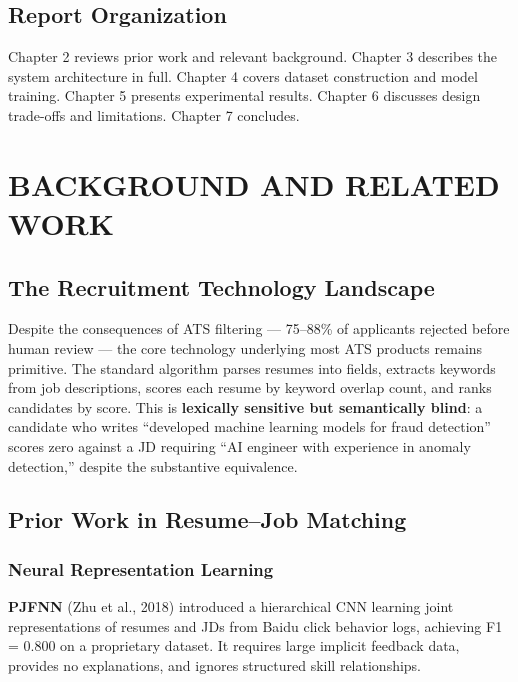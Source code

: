 \documentclass[12pt,a4paper]{report}
\begin{document}
\section{Report Organization}

Chapter 2 reviews prior work and relevant background. Chapter 3 describes the system architecture in full. Chapter 4 covers dataset construction and model training. Chapter 5 presents experimental results. Chapter 6 discusses design trade-offs and limitations. Chapter 7 concludes.

\chapter{BACKGROUND AND RELATED WORK}

\section{The Recruitment Technology Landscape}

Despite the consequences of ATS filtering --- 75--88\% of applicants rejected before human review --- the core technology underlying most ATS products remains primitive. The standard algorithm parses resumes into fields, extracts keywords from job descriptions, scores each resume by keyword overlap count, and ranks candidates by score. This is \textbf{lexically sensitive but semantically blind}: a candidate who writes ``developed machine learning models for fraud detection'' scores zero against a JD requiring ``AI engineer with experience in anomaly detection,'' despite the substantive equivalence.

\section{Prior Work in Resume--Job Matching}

\subsection{Neural Representation Learning}

\textbf{PJFNN} \cite{zhu2018} (Zhu et al., 2018) introduced a hierarchical CNN learning joint representations of resumes and JDs from Baidu click behavior logs, achieving F1 = 0.800 on a proprietary dataset. It requires large implicit feedback data, provides no explanations, and ignores structured skill relationships.
\end{document}
